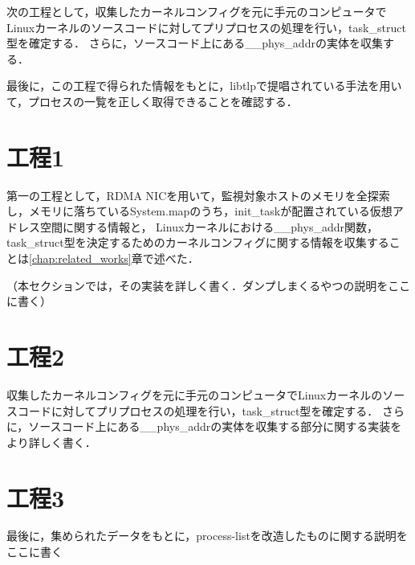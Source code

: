 次の工程として，収集したカーネルコンフィグを元に手元のコンピュータでLinuxカーネルのソースコードに対してプリプロセスの処理を行い，task_struct型を確定する．
さらに，ソースコード上にある__phys_addrの実体を収集する．

最後に，この工程で得られた情報をもとに，libtlpで提唱されている手法を用いて，プロセスの一覧を正しく取得できることを確認する．

\section{工程1}

第一の工程として，RDMA NICを用いて，監視対象ホストのメモリを全探索し，メモリに落ちているSystem.mapのうち，init_taskが配置されている仮想アドレス空間に関する情報と，
Linuxカーネルにおける__phys_addr関数，task_struct型を決定するためのカーネルコンフィグに関する情報を収集することは\ref{chap:related_works}章で述べた．

（本セクションでは，その実装を詳しく書く．ダンプしまくるやつの説明をここに書く）

\section{工程2}

収集したカーネルコンフィグを元に手元のコンピュータでLinuxカーネルのソースコードに対してプリプロセスの処理を行い，task_struct型を確定する．
さらに，ソースコード上にある__phys_addrの実体を収集する部分に関する実装をより詳しく書く．

\section{工程3}

最後に，集められたデータをもとに，process-listを改造したものに関する説明をここに書く
